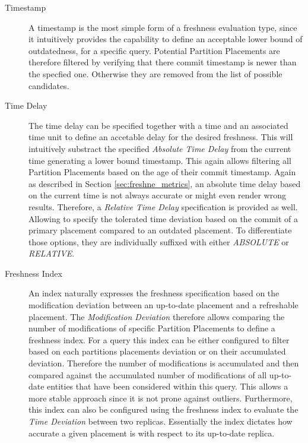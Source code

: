 \begin{description}
    \item[Timestamp] A timestamp is the most simple form of a freshness evaluation type, since it intuitively provides the capability to define 
    an acceptable lower bound of outdatedness, for a specific query. Potential Partition Placements are therefore filtered by verifying that there commit timestamp is newer
    than the specfied one. Otherwise they are removed from the list of possible candidates.
    
    \item[Time Delay]
    The time delay can be specified together with a time and an associated time unit to define an accetable delay for the desired freshness. 
    This will intuitively substract the specified \emph{Absolute Time Delay} from the current time generating a lower bound timestamp. 
    This again allows filtering all Partition Placements based on the age of their commit timestamp.
    Again as described in Section \ref{sec:freshne_metrics}, an absolute time delay based on the current time is not always accurate or might even render wrong results.
    Therefore, a \emph{Relative Time Delay} specification is provided as well. Allowing to specify the tolerated time deviation based on the commit of a primary placement 
    compared to an outdated placement. To differentiate those options, they are individually suffixed with either \emph{ABSOLUTE} or  \emph{RELATIVE}.

    \item[Freshness Index]
    An index naturally expresses the freshness specification based on the modification deviation between an up-to-date placement
    and a refreshable placement. The \emph{Modification Deviation} therefore allows comparing the number of modifications of specific Partition Placements
    to define a freshness index. For a query this index can be either configured to filter based on each partitions placements deviation or on their accumulated deviation.
    Therefore the number of modifications is accumulated and then compared against the accumulated number of modifications 
    of all up-to-date entities that have been considered within this query. This allows a more stable approach since it is not prone against outliers. 
    Furthermore, this index can also be configured using the freshness index to evaluate the \emph{Time Deviation} between two replicas. 
    Essentially the index dictates how accurate a given placement is with respect to its up-to-date replica.
    
\end{description}

